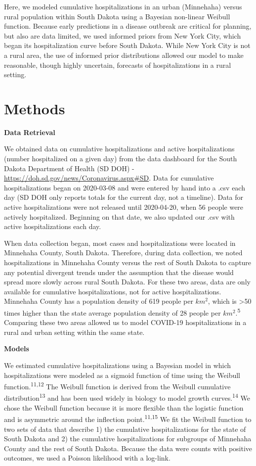 \documentclass[
]{article}
\begin{document}
Here, we modeled cumulative hospitalizations in an urban (Minnehaha) versus rural population within South Dakota using a Bayesian non-linear Weibull function. Because early predictions in a disease outbreak are critical for planning, but also are data limited, we used informed priors from New York City, which began its hospitalization curve before South Dakota. While New York City is not a rural area, the use of informed prior distributions allowed our model to make reasonable, though highly uncertain, forecasts of hospitalizations in a rural setting.

\hypertarget{methods}{%
\section{Methods}\label{methods}}

\textbf{Data Retrieval}

We obtained data on cumulative hospitalizations and active hospitalizations (number hospitalized on a given day) from the data dashboard for the South Dakota Department of Health (SD DOH) - \url{https://doh.sd.gov/news/Coronavirus.aspx\#SD}. Data for cumulative hospitalizations began on 2020-03-08 and were entered by hand into a .csv each day (SD DOH only reports totals for the current day, not a timeline). Data for active hospitalizations were not released until 2020-04-20, when 56 people were actively hospitalized. Beginning on that date, we also updated our .csv with active hospitalizations each day.

When data collection began, most cases and hospitalizations were located in Minnehaha County, South Dakota. Therefore, during data collection, we noted hospitalizations in Minnehaha County versus the rest of South Dakota to capture any potential divergent trends under the assumption that the disease would spread more slowly across rural South Dakota. For these two areas, data are only available for cumulative hospitalizations, not for active hospitalizations. Minnehaha County has a population density of 619 people per \(km^2\), which is \textgreater50 times higher than the state average population density of 28 people per \(km^2\).\textsuperscript{5} Comparing these two areas allowed us to model COVID-19 hospitalizations in a rural and urban setting within the same state.

\textbf{Models}

We estimated cumulative hospitalizations using a Bayesian model in which hospitalizations were modeled as a sigmoid function of time using the Weibull function.\textsuperscript{11,12} The Weibull function is derived from the Weibull cumulative distribution\textsuperscript{13} and has been used widely in biology to model growth curves.\textsuperscript{14} We chose the Weibull function because it is more flexible than the logistic function and is asymmetric around the inflection point.\textsuperscript{11,15} We fit the Weibull function to two sets of data that describe 1) the cumulative hospitalizations for the state of South Dakota and 2) the cumulative hospitalizations for subgroups of Minnehaha County and the rest of South Dakota. Because the data were counts with positive outcomes, we used a Poisson likelihood with a log-link.
\end{document}
